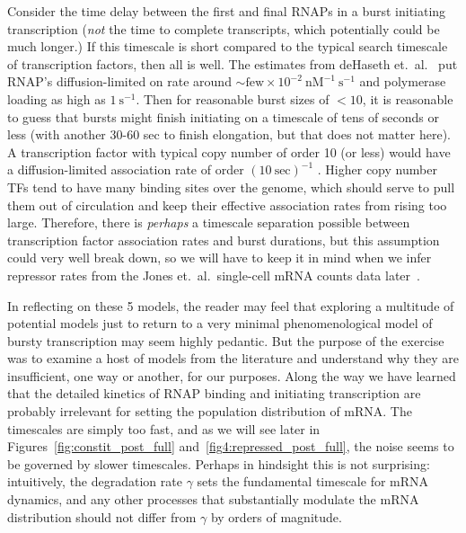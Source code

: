 Consider the time delay between the first and final RNAPs in a burst initiating
transcription (\textit{not} the time to complete transcripts, which potentially
could be much longer.) If this timescale is short compared to the typical search
timescale of transcription factors, then all is well. The estimates from
deHaseth et.\ al.~\cite{DeHaseth1998} put RNAP's diffusion-limited on rate
around $\sim\text{few}\times10^{-2}~\text{nM}^{-1}~\text{s}^{-1}$ and polymerase
loading as high as $1~\text{s}^{-1}$. Then for reasonable burst sizes of $<10$,
it is reasonable to guess that bursts might finish initiating on a timescale of
tens of seconds or less (with another 30-60 sec to finish elongation, but that
does not matter here). A transcription factor with typical copy number of order
10 (or less) would have a diffusion-limited association rate of order
$(10~\text{sec})^{-1}$ \cite{Hammar2014}. Higher copy number TFs tend to have
many binding sites over the genome, which should serve to pull them out of
circulation and keep their effective association rates from rising too large.
Therefore, there is \textit{perhaps} a timescale separation possible between
transcription factor association rates and burst durations, but this assumption
could very well break down, so we will have to keep it in mind when we infer
repressor rates from the Jones et.\ al.\ single-cell mRNA counts data
later~\cite{Jones2014}.

In reflecting on these 5 models, the reader may feel that exploring a multitude
of potential models just to return to a very minimal phenomenological model of
bursty transcription may seem highly pedantic. But the purpose of the exercise
was to examine a host of models from the literature and understand why they are
insufficient, one way or another, for our purposes. Along the way we have
learned that the detailed kinetics of RNAP binding and initiating transcription
are probably irrelevant for setting the population distribution of mRNA. The
timescales are simply too fast, and as we will see later in
Figures~\ref{fig:constit_post_full} and~\ref{fig4:repressed_post_full},
the noise seems to be governed by slower timescales.
Perhaps in hindsight this is not surprising: intuitively, the degradation rate
$\gamma$ sets the fundamental timescale for mRNA dynamics, and any other
processes that substantially modulate the mRNA distribution should not differ
from $\gamma$ by orders of magnitude.